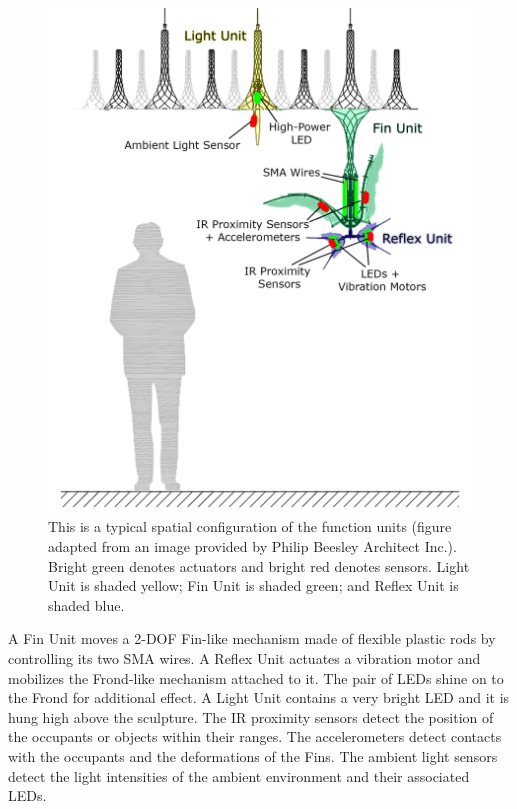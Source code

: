\begin{figure}[!htbp]
	\centering
	\includegraphics[height=0.85 \textheight]{"fig/interactive control system/Physical hardware"}
	\caption[Typical spatial configuration of the physical functional units]{This is a typical spatial configuration of the function units (figure adapted from an image provided by Philip Beesley Architect Inc.). Bright green denotes actuators and bright red denotes sensors. Light Unit is shaded yellow; Fin Unit is shaded green; and Reflex Unit is shaded blue.}
	\label{fig:Physical hardware}
\end{figure}

A Fin Unit moves a 2-DOF Fin-like mechanism made of flexible plastic rods by controlling its two SMA wires. A Reflex Unit actuates a vibration motor and mobilizes the Frond-like mechanism attached to it. The pair of LEDs shine on to the Frond for additional effect. A Light Unit contains a very bright LED and it is hung high above the sculpture. The IR proximity sensors detect the position of the occupants or objects within their ranges. The accelerometers detect contacts with the occupants and the deformations of the Fins. The ambient light sensors detect the light intensities of the ambient environment and their associated LEDs. 


